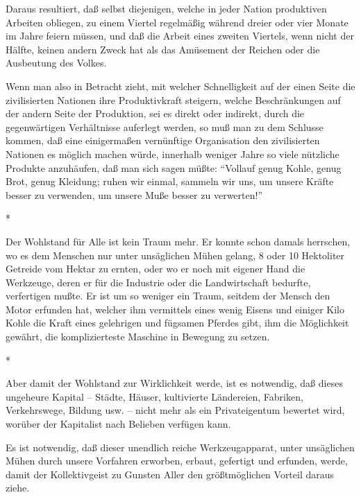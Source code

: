 \documentclass{scrbook}
\begin{document}
Daraus resultiert, daß selbst diejenigen, welche in jeder Nation produktiven Arbeiten obliegen, zu einem Viertel regelmäßig während dreier oder vier Monate im Jahre feiern müssen, und daß die Arbeit eines zweiten Viertels, wenn nicht der Hälfte, keinen andern Zweck hat als das Amüsement der Reichen oder die Ausbeutung des Volkes.

Wenn man also in Betracht zieht, mit welcher Schnelligkeit auf der einen Seite die zivilisierten Nationen ihre Produktivkraft steigern, welche Beschränkungen auf der andern Seite der Produktion, sei es direkt oder indirekt, durch die gegenwärtigen Verhältnisse auferlegt werden, so muß man zu dem Schlusse kommen, daß eine einigermaßen vernünftige Organisation den zivilisierten Nationen es möglich machen würde, innerhalb weniger Jahre so viele nützliche Produkte anzuhäufen, daß man sich sagen müßte: ``Vollauf genug Kohle, genug Brot, genug Kleidung; ruhen wir einmal, sammeln wir uns, um unsere Kräfte besser zu verwenden, um unsere Muße besser zu verwerten!''

\begin{center}*\end{center}

Der Wohlstand für Alle ist kein Traum mehr. Er konnte schon damals herrschen, wo es dem Menschen nur unter unsäglichen Mühen gelang, 8 oder 10 Hektoliter Getreide vom Hektar zu ernten, oder wo er noch mit eigener Hand die Werkzeuge, deren er für die Industrie oder die Landwirtschaft bedurfte, verfertigen mußte. Er ist um so weniger ein Traum, seitdem der Mensch den Motor erfunden hat, welcher ihm vermittels eines wenig Eisens und einiger Kilo Kohle die Kraft eines gelehrigen und fügsamen Pferdes gibt, ihm die Möglichkeit gewährt, die komplizierteste Maschine in Bewegung zu setzen.

\begin{center}*\end{center}

Aber damit der Wohlstand zur Wirklichkeit werde, ist es notwendig, daß dieses ungeheure Kapital – Städte, Häuser, kultivierte Ländereien, Fabriken, Verkehrswege, Bildung usw. – nicht mehr als ein Privateigentum bewertet wird, worüber der Kapitalist nach Belieben verfügen kann.

Es ist notwendig, daß dieser unendlich reiche Werkzeugapparat, unter unsäglichen Mühen durch unsere Vorfahren erworben, erbaut, gefertigt und erfunden,  werde, damit der Kollektivgeist zu Gunsten Aller den größtmöglichen Vorteil daraus ziehe.
\end{document}
